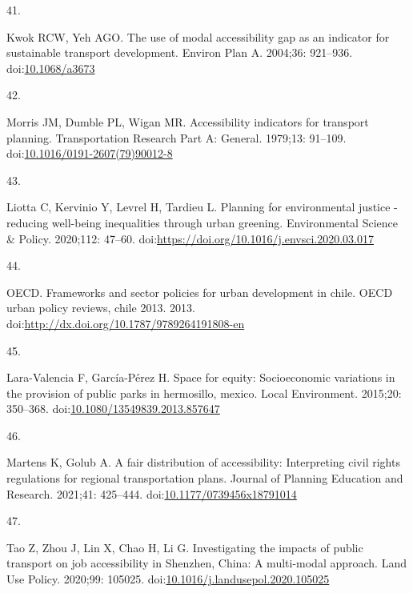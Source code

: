 \documentclass[10pt,letterpaper]{article}
\newlength{\cslhangindent}
\newlength{\csllabelwidth}
\newlength{\cslentryspacingunit} %
\newenvironment{CSLReferences}[2] %
 {%
  \setlength{\parindent}{0pt}
  \ifodd #1
  \let\oldpar\par
  \def\par{\hangindent=\cslhangindent\oldpar}
  \fi
  \setlength{\parskip}{#2\cslentryspacingunit}
 }%
 {}
\newcommand{\CSLLeftMargin}[1]{\parbox[t]{\csllabelwidth}{#1}}
\newcommand{\CSLRightInline}[1]{\parbox[t]{\linewidth - \csllabelwidth}{#1}\break}
\begin{document}
\begin{CSLReferences}{0}{0}
\leavevmode{}%
\CSLLeftMargin{41. }%
\CSLRightInline{Kwok RCW, Yeh AGO. The use of modal accessibility gap as
an indicator for sustainable transport development. Environ Plan A.
2004;36: 921--936.
doi:\href{https://doi.org/10.1068/a3673}{10.1068/a3673}}

\leavevmode{}%
\CSLLeftMargin{42. }%
\CSLRightInline{Morris JM, Dumble PL, Wigan MR. Accessibility indicators
for transport planning. Transportation Research Part A: General.
1979;13: 91--109.
doi:\href{https://doi.org/10.1016/0191-2607(79)90012-8}{10.1016/0191-2607(79)90012-8}}

\leavevmode{}%
\CSLLeftMargin{43. }%
\CSLRightInline{Liotta C, Kervinio Y, Levrel H, Tardieu L. Planning for
environmental justice - reducing well-being inequalities through urban
greening. Environmental Science \& Policy. 2020;112: 47--60.
doi:\url{https://doi.org/10.1016/j.envsci.2020.03.017}}

\leavevmode{}%
\CSLLeftMargin{44. }%
\CSLRightInline{OECD. Frameworks and sector policies for urban
development in chile. OECD urban policy reviews, chile 2013. 2013.
doi:\url{http://dx.doi.org/10.1787/9789264191808-en}}

\leavevmode{}%
\CSLLeftMargin{45. }%
\CSLRightInline{Lara-Valencia F, García-Pérez H. Space for equity:
Socioeconomic variations in the provision of public parks in hermosillo,
mexico. Local Environment. 2015;20: 350--368.
doi:\href{https://doi.org/10.1080/13549839.2013.857647}{10.1080/13549839.2013.857647}}

\leavevmode{}%
\CSLLeftMargin{46. }%
\CSLRightInline{Martens K, Golub A. A fair distribution of
accessibility: Interpreting civil rights regulations for regional
transportation plans. Journal of Planning Education and Research.
2021;41: 425--444.
doi:\href{https://doi.org/10.1177/0739456x18791014}{10.1177/0739456x18791014}}

\leavevmode{}%
\CSLLeftMargin{47. }%
\CSLRightInline{Tao Z, Zhou J, Lin X, Chao H, Li G. Investigating the
impacts of public transport on job accessibility in {Shenzhen}, {China}:
A multi-modal approach. Land Use Policy. 2020;99: 105025.
doi:\href{https://doi.org/10.1016/j.landusepol.2020.105025}{10.1016/j.landusepol.2020.105025}}


\end{CSLReferences}
\end{document}
